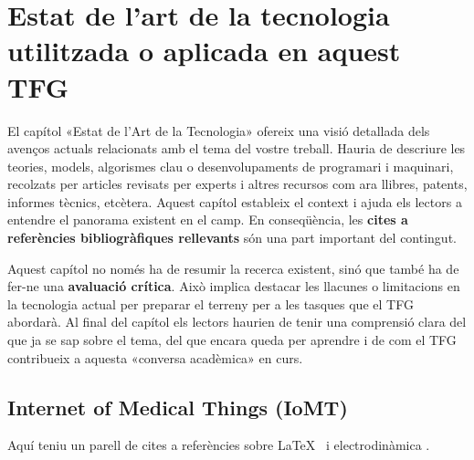 
\ifcase\doclanguage
\or
  \chapter[Estat de l'art]{Estat de l'art de la tecnologia utilitzada o aplicada en aquest TFG}

  El capítol «Estat de l'Art de la Tecnologia» ofereix una visió detallada dels avenços actuals relacionats amb el tema del vostre treball. Hauria de descriure les teories, models, algorismes clau o desenvolupaments de programari i maquinari, recolzats per articles revisats per experts i altres recursos com ara llibres, patents, informes tècnics, etcètera. Aquest capítol estableix el context i ajuda els lectors a entendre el panorama existent en el camp. En conseqüència, les \textbf{cites a referències bibliogràfiques rellevants} són una part important del contingut.
  
  Aquest capítol no només ha de resumir la recerca existent, sinó que també ha de fer-ne una \textbf{avaluació crítica}. Això implica destacar les llacunes o limitacions en la tecnologia actual per preparar el terreny per a les tasques que el TFG abordarà. Al final del capítol els lectors haurien de tenir una comprensió clara del que ja se sap sobre el tema, del que encara queda per aprendre i de com el TFG contribueix a aquesta «conversa acadèmica» en curs.

  \section{Internet of Medical Things (IoMT)} 

  Aquí teniu un parell de cites a referències sobre \LaTeX~\cite{latexcompanion} i electrodinàmica \cite{einstein}.

